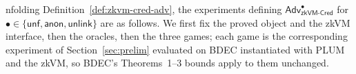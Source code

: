 %


\newenvironment{gamebox}[1]{%
  \par\medskip\noindent
  \setlength{\fboxsep}{8pt}%
  \noindent\fbox{\begin{minipage}{\dimexpr\linewidth-2\fboxsep-2\fboxrule\relax}%
  \textbf{#1}\par\smallskip
}{%
  \end{minipage}}\par\medskip
}



Unfolding Definition~\ref{def:zkvm-cred-adv}, the experiments defining
$\mathsf{Adv}^{\bullet}_{\mathsf{zkVM\text{-}Cred}}$ for
$\bullet\in\{\mathsf{unf},\mathsf{anon},\mathsf{unlink}\}$ are as follows. We
first fix the proved object and the zkVM interface, then the oracles, then the
three games; each game is the corresponding experiment of
Section~\ref{sec:prelim} evaluated on BDEC instantiated with PLUM and the zkVM,
so BDEC's Theorems~1--3 bounds apply to them unchanged.

